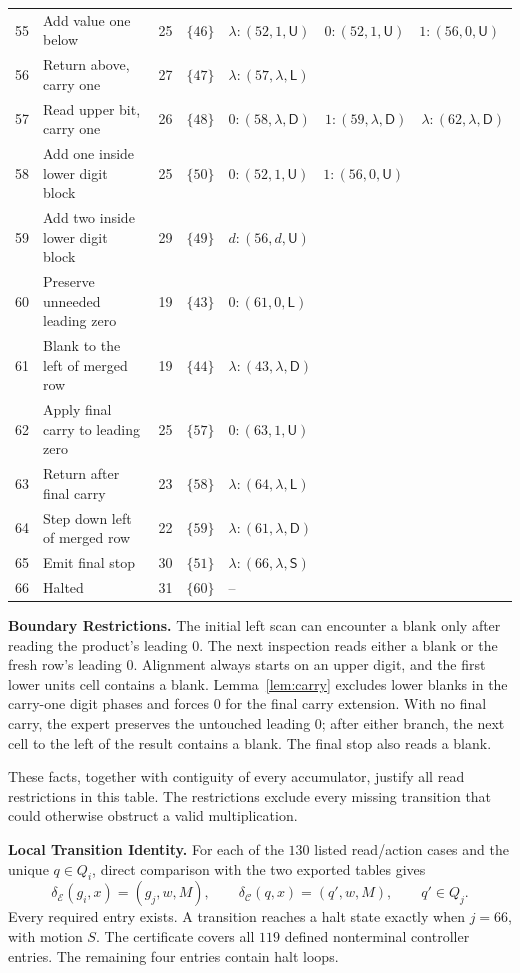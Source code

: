 \documentclass[11pt,a4paper]{article}
\newcommand{\blank}{\lambda}
\newcommand{\EXPERT}{\mathcal E}
\newcommand{\CTRL}{\mathcal C}
\newcommand{\triple}[3]{(#1,#2,\mathsf{#3})}
\begin{document}
\begin{center}
\begin{tabularx}{\textwidth}{r p{6cm} c c X}
55 & Add value one below & 25 & $\{46\}$ & $\blank:\triple{52}{1}{U}\quad 0:\triple{52}{1}{U}\quad 1:\triple{56}{0}{U}$ \\
56 & Return above, carry one & 27 & $\{47\}$ & $\blank:\triple{57}{\blank}{L}$ \\
57 & Read upper bit, carry one & 26 & $\{48\}$ & $0:\triple{58}{\blank}{D}\quad 1:\triple{59}{\blank}{D}\quad \blank:\triple{62}{\blank}{D}$ \\
58 & Add one inside lower digit block & 25 & $\{50\}$ & $0:\triple{52}{1}{U}\quad 1:\triple{56}{0}{U}$ \\
59 & Add two inside lower digit block & 29 & $\{49\}$ & $d:\triple{56}{d}{U}$ \\
60 & Preserve unneeded leading zero & 19 & $\{43\}$ & $0:\triple{61}{0}{L}$ \\
61 & Blank to the left of merged row & 19 & $\{44\}$ & $\blank:\triple{43}{\blank}{D}$ \\
62 & Apply final carry to leading zero & 25 & $\{57\}$ & $0:\triple{63}{1}{U}$ \\
63 & Return after final carry & 23 & $\{58\}$ & $\blank:\triple{64}{\blank}{L}$ \\
64 & Step down left of merged row & 22 & $\{59\}$ & $\blank:\triple{61}{\blank}{D}$ \\
65 & Emit final stop & 30 & $\{51\}$ & $\blank:\triple{66}{\blank}{S}$ \\
66 & Halted & 31 & $\{60\}$ & $\text{--}$ \\
\bottomrule
\end{tabularx}
\end{center}

\textbf{Boundary Restrictions.}
The initial left scan can encounter a blank only after reading the product's
leading $0$. The next inspection reads either a blank or the fresh row's leading $0$.
Alignment always starts on an upper digit, and the first lower units cell contains a blank. Lemma~\ref{lem:carry} excludes lower blanks in the carry-one digit
phases and forces $0$ for the final carry extension. With no final carry, the expert preserves the untouched leading $0$; after either branch, the next cell to the left of the result contains a blank. The final stop also reads a blank.

These facts, together with contiguity of every accumulator, justify all
read restrictions in this table. The restrictions exclude every missing transition
that could otherwise obstruct a valid multiplication.

\textbf{Local Transition Identity.}
For each of the $130$ listed read/action cases and the unique $q\in Q_i$, direct comparison with the
two exported tables gives
\begin{equation}
\delta_\EXPERT(g_i,x)=(g_j,w,M),\qquad
\delta_\CTRL(q,x)=(q',w,M),\qquad q'\in Q_j. \tag{3}
\end{equation}
Every required entry exists. A transition reaches a halt state exactly
when $j=66$, with motion $S$. The certificate covers all $119$ defined
nonterminal controller entries. The remaining four entries contain halt loops.
\end{document}
